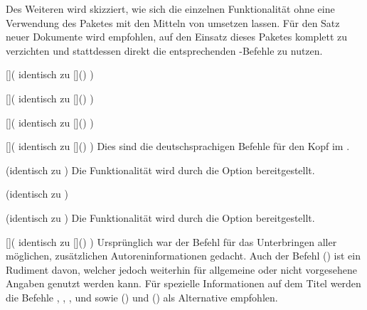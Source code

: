 \begin{Bundle*}{}
Des Weiteren wird skizziert, wie sich die einzelnen Funktionalität ohne eine 
Verwendung des Paketes  mit den Mitteln von \TUDScript 
umsetzen lassen. Für den Satz neuer Dokumente wird empfohlen, auf den Einsatz 
dieses Paketes komplett zu verzichten und stattdessen direkt die entsprechenden 
\TUDScript-Befehle zu nutzen.

\begin{Declaration}{[]}(%
  identisch zu []()%
)
\begin{Declaration}{[]}(%
  identisch zu []()%
)
\begin{Declaration}{[]}(%
  identisch zu []()%
)
\begin{Declaration}{[]}(%
  identisch zu []()%
)
\printdeclarationlist%
%
Dies sind die deutschsprachigen Befehle für den Kopf im \CD.
\end{Declaration}
\end{Declaration}
\end{Declaration}
\end{Declaration}

\begin{Declaration}{}(identisch zu )
\printdeclarationlist%
%
Die Funktionalität wird durch die Option  bereitgestellt.
\end{Declaration}

\begin{Declaration}{}(identisch zu )
\begin{Declaration}{}(identisch zu )
\printdeclarationlist%
%
Die Funktionalität wird durch die Option  bereitgestellt.
\end{Declaration}
\end{Declaration}

\begin{Declaration}{[]}(%
  identisch zu []()%
)
\printdeclarationlist%
%
Ursprünglich war der Befehl für das Unterbringen aller möglichen, zusätzlichen 
Autoreninformationen gedacht. Auch der Befehl () ist ein 
Rudiment davon, welcher jedoch weiterhin für allgemeine oder nicht vorgesehene 
Angaben genutzt werden kann. Für spezielle Informationen auf dem Titel werden 
die Befehle , , , 
 und  sowie 
() und () als Alternative empfohlen.
\end{Declaration}


\end{Bundle*}
